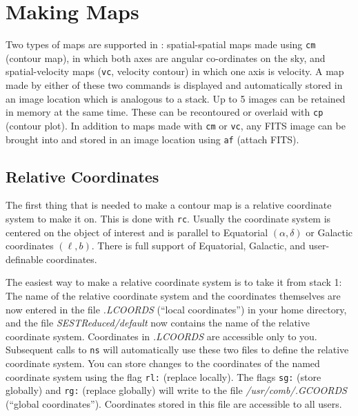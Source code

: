 \section{Making Maps} 
\label{sec-map}

Two types of maps are supported in \C: spatial-spatial maps made using
{\tt cm} (contour map), in which both axes are angular co-ordinates on the sky,
and spatial-velocity maps ({\tt vc}, velocity contour) in which one axis 
is velocity.  A map made by either of these two commands is displayed and 
automatically stored in an image location which is analogous to a stack.
Up to 5 images can be retained in memory at the same time.  These can be
recontoured or overlaid with {\tt cp} (contour plot). 
In addition to maps made with {\tt cm} or {\tt vc},
any FITS image can be brought into \COMB and stored in an image location
using {\tt af} (attach FITS).

\subsection{Relative Coordinates}

The first thing that is needed to make a contour map is a relative coordinate 
system to make it on. This is done with {\tt rc}. Usually the coordinate
system is centered on the object of interest and is parallel to
Equatorial $(\alpha,\delta)$ or Galactic coordinates $(\ell,b)$.
There is full support of Equatorial, Galactic, and user-definable coordinates. 

The easiest way to make a relative coordinate system is to take
it from stack 1:
\smallskip
{}
\smallskip\noindent
The name of the relative coordinate system and the coordinates themselves are
now entered in the file {\sl .LCOORDS\/} (``local coordinates'') in your 
home directory, and the file {\sl SESTReduced/default\/} 
now contains the name of the relative coordinate system.
Coordinates in {\sl .LCOORDS\/} are accessible only to you.
Subsequent calls to {\tt ns} will automatically use these two files to 
define the relative coordinate system. You can store changes to the coordinates 
of the named coordinate system using the flag {\tt rl:} (replace locally). The
flags {\tt sg:} (store globally) and {\tt rg:} (replace globally) will write 
to the file {\sl /usr/comb/.GCOORDS} (``global coordinates''). 
Coordinates stored in this file are accessible to all users. 

